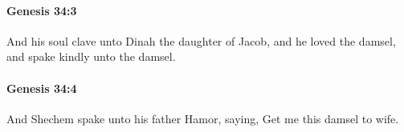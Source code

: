 		\paragraph{Genesis 34:3} %
			\label{GENESIS-34-3}

			And his soul clave unto Dinah the daughter of Jacob, and he loved the damsel, and spake kindly unto the damsel.


		\paragraph{Genesis 34:4} %
			\label{GENESIS-34-4}

			And Shechem spake unto his father Hamor, saying, Get me this damsel to wife.



